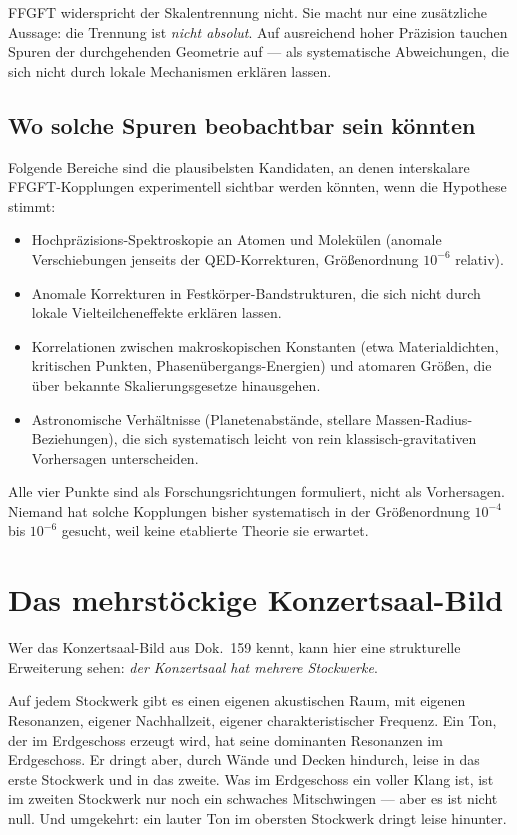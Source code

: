 FFGFT widerspricht der Skalentrennung nicht. Sie macht nur eine
zusätzliche Aussage: die Trennung ist \emph{nicht absolut}. Auf
ausreichend hoher Präzision tauchen Spuren der durchgehenden Geometrie
auf --- als systematische Abweichungen, die sich nicht durch lokale
Mechanismen erklären lassen.

\subsection*{Wo solche Spuren beobachtbar sein könnten}

Folgende Bereiche sind die plausibelsten Kandidaten, an denen
interskalare FFGFT-Kopplungen experimentell sichtbar werden könnten,
wenn die Hypothese stimmt:

\begin{itemize}\setlength\itemsep{2pt}
  \item Hochpräzisions-Spektroskopie an Atomen und Molekülen
        (anomale Verschiebungen jenseits der QED-Korrekturen,
        Größenordnung $10^{-6}$ relativ).
  \item Anomale Korrekturen in Festkörper-Bandstrukturen, die sich
        nicht durch lokale Vielteilcheneffekte erklären lassen.
  \item Korrelationen zwischen makroskopischen Konstanten (etwa
        Materialdichten, kritischen Punkten, Phasenübergangs-Energien)
        und atomaren Größen, die über bekannte Skalierungsgesetze
        hinausgehen.
  \item Astronomische Verhältnisse (Planetenabstände, stellare
        Massen-Radius-Beziehungen), die sich systematisch leicht von
        rein klassisch-gravitativen Vorhersagen unterscheiden.
\end{itemize}

Alle vier Punkte sind als Forschungsrichtungen formuliert, nicht als
Vorhersagen. Niemand hat solche Kopplungen bisher systematisch in der
Größenordnung $10^{-4}$ bis $10^{-6}$ gesucht, weil keine etablierte
Theorie sie erwartet.

\section{Das mehrstöckige Konzertsaal-Bild}

Wer das Konzertsaal-Bild aus Dok.~159 kennt, kann hier eine
strukturelle Erweiterung sehen: \emph{der Konzertsaal hat mehrere
Stockwerke}.

Auf jedem Stockwerk gibt es einen eigenen akustischen Raum, mit eigenen
Resonanzen, eigener Nachhallzeit, eigener charakteristischer Frequenz.
Ein Ton, der im Erdgeschoss erzeugt wird, hat seine dominanten
Resonanzen im Erdgeschoss. Er dringt aber, durch Wände und Decken
hindurch, leise in das erste Stockwerk und in das zweite. Was im
Erdgeschoss ein voller Klang ist, ist im zweiten Stockwerk nur noch
ein schwaches Mitschwingen --- aber es ist nicht null. Und umgekehrt:
ein lauter Ton im obersten Stockwerk dringt leise hinunter.

